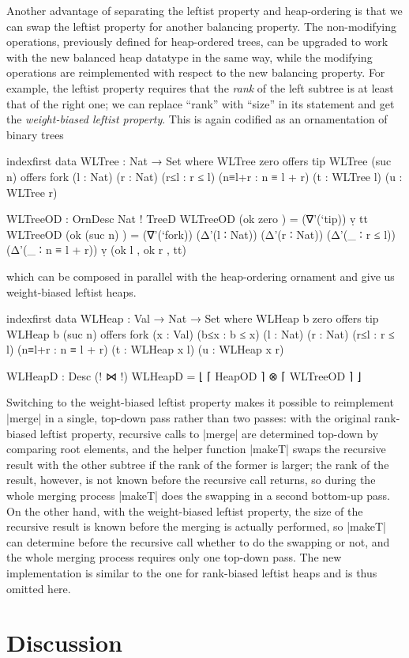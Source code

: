 Another advantage of separating the leftist property and heap-ordering is that we can swap the leftist property for another balancing property.
The non-modifying operations, previously defined for heap-ordered trees, can be upgraded to work with the new balanced heap datatype in the same way, while the modifying operations are reimplemented with respect to the new balancing property.
For example, the leftist property requires that the \emph{rank} of the left subtree is at least that of the right one; we can replace ``rank'' with ``size'' in its statement and get the \emph{weight-biased leftist property}.
This is again codified as an ornamentation of binary trees
\begin{code}
indexfirst data WLTree : Nat → Set where
  WLTree zero     offers   tip
  WLTree (suc n)  offers   fork  (l : Nat) (r : Nat)
                                 (r≤l : r ≤ l) (n≡l+r : n ≡ l + r)
                                 (t : WLTree l) (u : WLTree r)

WLTreeOD : OrnDesc Nat ! TreeD
WLTreeOD (ok zero     )  =  (∇'(`tip)) ṿ tt
WLTreeOD (ok (suc n)  )  =  (∇'(`fork)) (Δ'(l ∶ Nat)) (Δ'(r ∶ Nat))
                              (Δ'(_ ∶ r ≤ l)) (Δ'(_ ∶ n ≡ l + r)) ṿ (ok l , ok r , tt)
\end{code}
which can be composed in parallel with the heap-ordering ornament and give us weight-biased leftist heaps.
\begin{code}
indexfirst data WLHeap : Val → Nat → Set where
  WLHeap b zero     offers  tip
  WLHeap b (suc n)  offers  fork  (x : Val) (b≤x : b ≤ x)
                                  (l : Nat) (r : Nat)
                                  (r≤l : r ≤ l) (n≡l+r : n ≡ l + r)
                                  (t : WLHeap x l) (u : WLHeap x r)

WLHeapD : Desc (! ⋈ !)
WLHeapD = ⌊ ⌈ HeapOD ⌉ ⊗ ⌈ WLTreeOD ⌉ ⌋
\end{code}
Switching to the weight-biased leftist property makes it possible to reimplement |merge| in a single, top-down pass rather than two passes: with the original rank-biased leftist property, recursive calls to |merge| are determined top-down by comparing root elements, and the helper function |makeT| swaps the recursive result with the other subtree if the rank of the former is larger; the rank of the result, however, is not known before the recursive call returns, so during the whole merging process |makeT| does the swapping in a second bottom-up pass.
On the other hand, with the weight-biased leftist property, the size of the recursive result is known before the merging is actually performed, so |makeT| can determine before the recursive call whether to do the swapping or not, and the whole merging process requires only one top-down pass.
The new implementation is similar to the one for rank-biased leftist heaps and is thus omitted here.

\section{Discussion}

